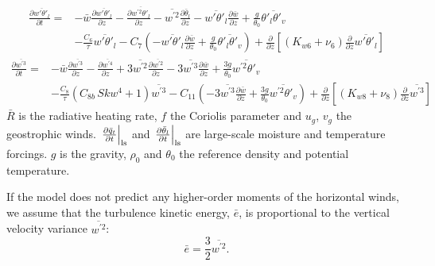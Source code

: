 \documentclass[11pt,fleqn]{article}
\newcommand{\ptlder}[2]{\frac{\partial #1}{\partial #2}}
\begin{document}
\begin{equation}
\label{eq_wpthlp}
\begin{split}
\ptlder{\overline{w'\theta'_l}}{t}
= & - \bar{w}\ptlder{\overline{w'\theta'_l}}{z}	 
    - \ptlder{\overline{w^{'2}\theta'_l}}{z}
    - \overline{w^{'2}}\ptlder{\bar{\theta}_l}{z} 
    - \overline{w'\theta'_l}\ptlder{\bar{w}}{z}
    + \frac{g}{\theta_0} \overline{\theta'_l\theta'_v} \\
  & - \frac{C_6}{\tau}\overline{w'\theta'_l}
    - C_7 \left( 
             - \overline{w'\theta'_l}\ptlder{\bar{w}}{z}
             + \frac{g}{\theta_0} \overline{\theta'_l\theta'_v}
          \right)
    + \ptlder{}{z} \left[ \left( K_{w6} + \nu_6 \right)
                          \ptlder{}{z} \overline{w'\theta'_l} 
                   \right]
\end{split}
\end{equation}
%
\begin{equation}
\label{eq_wp3}
\begin{split}
\ptlder{\overline{w^{'3}}}{t}
= & - \bar{w}\ptlder{\overline{w^{'3}}}{z}
    - \ptlder{\overline{w^{'4}}}{z} 
    + 3\overline{w^{'2}}\ptlder{\overline{w^{'2}}}{z}
    - 3\overline{w^{'3}}\ptlder{\bar{w}}{z}
    + \frac{3g}{\theta_0} \overline{w^{'2}\theta'_v} \\
  & - \frac{C_8}{\tau}\left( C_{8b} \, Skw^4 + 1 \right) \overline{w^{'3}}
    - C_{11} \left(
                - 3 \overline{w^{'3}}\ptlder{\bar{w}}{z}
                + \frac{3g}{\theta_0} \overline{w^{'2}\theta'_v}
             \right)
    + \ptlder{}{z} \left[ \left( K_{w8} + \nu_8 \right)
                          \ptlder{}{z} \overline{w^{'3}} 
                   \right]
\end{split}
\end{equation}
%
$\bar{R}$ is the radiative heating rate, 
$f$ the Coriolis parameter and $u_g$, $v_g$ the geostrophic winds.
$\left. \ptlder{\bar{q}_t}{t} \right|_{\rm ls}$ and 
$\left. \ptlder{\bar{\theta}_l}{t} \right|_{\rm ls}$ are
large-scale moisture and temperature forcings.
$g$ is the gravity, $\rho_0$ and $\theta_0$ the reference
density and potential temperature.

If the model does not predict any higher-order moments of the
horizontal winds, we assume that the turbulence kinetic energy, $\bar{e}$,
is proportional to the vertical velocity variance $\overline{w^{'2}}$:
%
\begin{equation}
\label{eq_tke}
\bar{e} = \frac{3}{2} \overline{w^{'2}}.
\end{equation}
%
\end{document}
